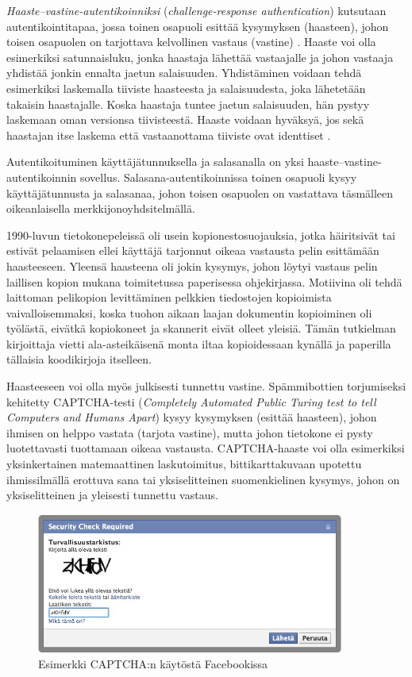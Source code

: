 \documentclass[finnish,gradu]{tktltiki}
\begin{document}
  \emph{Haaste--vastine-autentikoinniksi} (\emph{challenge-response authentication}) kutsutaan autentikointitapaa, jossa toinen osapuoli esittää kysymyksen (haasteen), johon toisen osapuolen on tarjottava kelvollinen vastaus (vastine) \cite{NIST_SP800-63-1}. Haaste voi olla esimerkiksi satunnaisluku, jonka haastaja lähettää vastaajalle ja johon vastaaja yhdistää jonkin ennalta jaetun salaisuuden. Yhdistäminen voidaan tehdä esimerkiksi laskemalla tiiviste haasteesta ja salaisuudesta, joka lähetetään takaisin haastajalle. Koska haastaja tuntee jaetun salaisuuden, hän pystyy laskemaan oman versionsa tiivisteestä. Haaste voidaan hyväksyä, jos sekä haastajan itse laskema että vastaanottama tiiviste ovat identtiset \cite{NIST_SP800-63-1}.

  Autentikoituminen käyttäjätunnuksella ja salasanalla on yksi haaste--vastine-autentikoinnin sovellus. Salasana-autentikoinnissa toinen osapuoli kysyy käyttäjätunnusta ja salasanaa, johon toisen osapuolen on vastattava täsmälleen oikeanlaisella merkkijonoyhdsitelmällä.

  1990-luvun tietokonepeleissä oli usein kopionestosuojauksia, jotka häiritsivät tai estivät pelaamisen ellei käyttäjä tarjonnut oikeaa vastausta pelin esittämään haasteeseen. Yleensä haasteena oli jokin kysymys, johon löytyi vastaus pelin laillisen kopion mukana toimitetussa paperisessa ohjekirjassa. Motiivina oli tehdä laittoman pelikopion levittäminen pelkkien tiedostojen kopioimista vaivalloisemmaksi, koska tuohon aikaan laajan dokumentin kopioiminen oli työlästä, eivätkä kopiokoneet ja skannerit eivät olleet yleisiä. Tämän tutkielman kirjoittaja vietti ala-asteikäisenä monta iltaa kopioidessaan kynällä ja paperilla tällaisia koodikirjoja itselleen.

  Haasteeseen voi olla myös julkisesti tunnettu vastine. Spämmibottien torjumiseksi kehitetty CAPTCHA-testi (\emph{Completely Automated Public Turing test to tell Computers and Humans Apart}) kysyy kysymyksen (esittää haasteen), johon ihmisen on helppo vastata (tarjota vastine), mutta johon tietokone ei pysty luotettavasti tuottamaan oikeaa vastausta. CAPTCHA-haaste voi olla esimerkiksi yksinkertainen matemaattinen laskutoimitus, bittikarttakuvaan upotettu ihmissilmällä erottuva sana tai yksiselitteinen suomenkielinen kysymys, johon on yksiselitteinen ja yleisesti tunnettu vastaus.

  \begin{figure}
    \centering
    \includegraphics[width=0.9\textwidth]{images/Facebook_captcha_filled.jpg}
    \caption{Esimerkki CAPTCHA:n käytöstä Facebookissa}
    \label{fig:yleiskuva}
  \end{figure}
\end{document}
